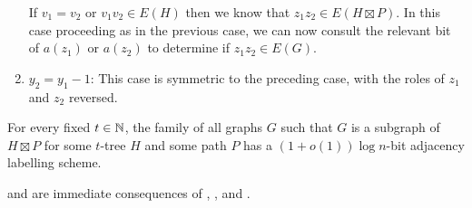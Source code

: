 \documentclass[kpfonts]{patmorin}
\let\le\leqslant
\begin{document}
\begin{enumerate}
  If $v_1=v_2$ or $v_1v_2\in E(H)$ then we know that $z_1z_2\in E(H\boxtimes P)$.  
  In this case proceeding as in the previous case, we can now consult the relevant bit of $a(z_1)$ or $a(z_2)$ to determine if $z_1z_2\in E(G)$.

  \item $y_2=y_1-1$:  This case is symmetric to the preceding case, with the roles of $z_1$ and $z_2$ reversed.
\end{enumerate}


\begin{thm}
  For every fixed $t\in\mathbb{N}$, the family of all graphs $G$ such that $G$ is a subgraph of $H\boxtimes P$ for some $t$-tree $H$ and some path $P$ has a $(1+o(1))\log n$-bit adjacency labelling scheme.
\end{thm}

 and  are immediate consequences of , , and .
\end{document}
